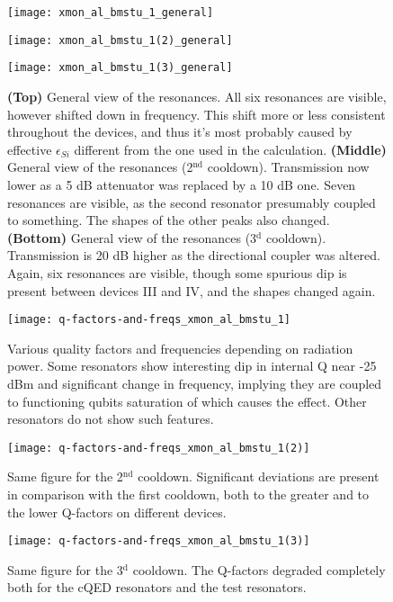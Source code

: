 \begin{figure}[h!]
\centering
\texttt{[image: xmon\_al\_bmstu\_1\_general]}

\texttt{[image: xmon\_al\_bmstu\_1(2)\_general]}

\texttt{[image: xmon\_al\_bmstu\_1(3)\_general]}


\caption{\textbf{(Top)} General view of the resonances. All six resonances are visible, however shifted down in frequency. This shift more or less consistent throughout the devices, and thus it's most probably caused by effective $\epsilon_{Si}$ different from the one used in the calculation. \textbf{(Middle)} General view of the resonances (2$^\text{nd}$ cooldown). Transmission now lower as a 5 dB attenuator was replaced by a 10 dB one. Seven resonances are visible, as the second resonator presumably coupled to something. The shapes of the other peaks also changed. \textbf{(Bottom)} General view of the resonances (3$^\text{d}$ cooldown).  Transmission is 20 dB higher as the directional coupler was altered. Again, six resonances are visible, though some spurious dip is present between devices III and IV, and the shapes changed again.}
\label{fig:second_resonators_general}
\end{figure}


\begin{figure}[h!]
\centering

\texttt{[image: q-factors-and-freqs\_xmon\_al\_bmstu\_1]}

\caption{Various quality factors and frequencies depending on radiation power. Some resonators show interesting dip in internal Q near -25 dBm and significant change in frequency, implying they are coupled to functioning qubits saturation of which causes the effect. Other resonators do not show such features.}
\label{fig:second_q_factors}
\end{figure}

\begin{figure}[h!]
\centering
\texttt{[image: q-factors-and-freqs\_xmon\_al\_bmstu\_1(2)]}
\caption{Same figure for the 2$^\text{nd}$ cooldown. Significant deviations are present in comparison with the first cooldown, both to the greater and to the lower Q-factors on different devices.}
\label{fig:second_q_factors(2)}
\end{figure}

\begin{figure}[h!]
\centering
\texttt{[image: q-factors-and-freqs\_xmon\_al\_bmstu\_1(3)]}
\caption{Same figure for the 3$^\text{d}$ cooldown. The Q-factors degraded completely both for the cQED resonators and the test resonators.}
\label{fig:second_q_factors(3)}
\end{figure}

